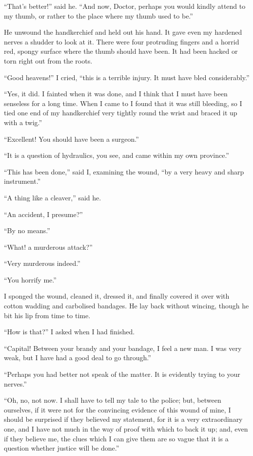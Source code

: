 \documentclass{article}
\begin{document}
``That's better!'' said he. ``And now, Doctor, perhaps you would kindly
attend to my thumb, or rather to the place where my thumb used to be.''

He unwound the handkerchief and held out his hand. It gave even my
hardened nerves a shudder to look at it. There were four protruding
fingers and a horrid red, spongy surface where the thumb should have
been. It had been hacked or torn right out from the roots.

``Good heavens!'' I cried, ``this is a terrible injury. It must have
bled considerably.''

``Yes, it did. I fainted when it was done, and I think that I must have
been senseless for a long time. When I came to I found that it was still
bleeding, so I tied one end of my handkerchief very tightly round the
wrist and braced it up with a twig.''

``Excellent! You should have been a surgeon.''

``It is a question of hydraulics, you see, and came within my own
province.''

``This has been done,'' said I, examining the wound, ``by a very heavy
and sharp instrument.''

``A thing like a cleaver,'' said he.

``An accident, I presume?''

``By no means.''

``What! a murderous attack?''

``Very murderous indeed.''

``You horrify me.''

I sponged the wound, cleaned it, dressed it, and finally covered it over
with cotton wadding and carbolised bandages. He lay back without wincing,
though he bit his lip from time to time.

``How is that?'' I asked when I had finished.

``Capital! Between your brandy and your bandage, I feel a new man. I
was very weak, but I have had a good deal to go through.''

``Perhaps you had better not speak of the matter. It is evidently trying
to your nerves.''

``Oh, no, not now. I shall have to tell my tale to the police; but,
between ourselves, if it were not for the convincing evidence of this
wound of mine, I should be surprised if they believed my statement,
for it is a very extraordinary one, and I have not much in the way of
proof with which to back it up; and, even if they believe me, the clues
which I can give them are so vague that it is a question whether justice
will be done.''
\end{document}
